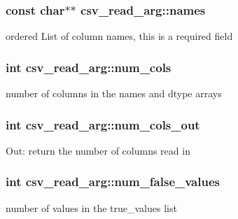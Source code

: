 \subsubsection[{\texorpdfstring{names}{names}}]{\setlength{\rightskip}{0pt plus 5cm}const char$\ast$$\ast$ csv\+\_\+read\+\_\+arg\+::names}\hypertarget{structcsv__read__arg_a3247fa972982b72caf56290c93ff5847}{}\label{structcsv__read__arg_a3247fa972982b72caf56290c93ff5847}
ordered List of column names, this is a required field 
\subsubsection[{\texorpdfstring{num\+\_\+cols}{num_cols}}]{\setlength{\rightskip}{0pt plus 5cm}int csv\+\_\+read\+\_\+arg\+::num\+\_\+cols}\hypertarget{structcsv__read__arg_adf9ce0492da45bdbaa63f95bc2313957}{}\label{structcsv__read__arg_adf9ce0492da45bdbaa63f95bc2313957}
number of columns in the names and dtype arrays 
\subsubsection[{\texorpdfstring{num\+\_\+cols\+\_\+out}{num_cols_out}}]{\setlength{\rightskip}{0pt plus 5cm}int csv\+\_\+read\+\_\+arg\+::num\+\_\+cols\+\_\+out}\hypertarget{structcsv__read__arg_a14d86f0cfad2d55094fb5f43d27b7aee}{}\label{structcsv__read__arg_a14d86f0cfad2d55094fb5f43d27b7aee}
Out\+: return the number of columns read in 
\subsubsection[{\texorpdfstring{num\+\_\+false\+\_\+values}{num_false_values}}]{\setlength{\rightskip}{0pt plus 5cm}int csv\+\_\+read\+\_\+arg\+::num\+\_\+false\+\_\+values}\hypertarget{structcsv__read__arg_a330d59c9b97300fe16d48afa461d2d32}{}\label{structcsv__read__arg_a330d59c9b97300fe16d48afa461d2d32}
number of values in the true\+\_\+values list 
